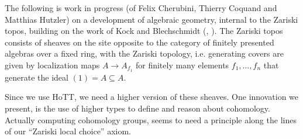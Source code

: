 
The following is work in progress (of Felix Cherubini, Thierry Coquand and Matthias  Hutzler) on a development of algebraic geometry, internal to the Zariski topos, building on the work of Kock and Blechschmidt (\cite{MISSING}, \cite{ingo-thesis}).
The Zariski topos consists of sheaves on the site opposite to the category of finitely presented algebras over a fixed ring, with the Zariski topology, i.e. generating covers are given by localization maps $A\to A_{f_1}$ for finitely many elements $f_1,\dots,f_n$ that generate the ideal $(1)=A\subseteq A$.

Since we use HoTT, we need a higher version of these sheaves.
One innovation we present, is the use of higher types to define and reason about cohomology.
Actually computing cohomology groups, seems to need a principle along the lines of our ``Zariski local choice'' axiom.